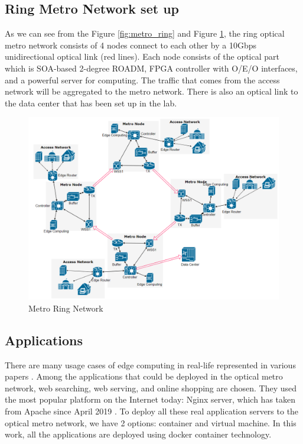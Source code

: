\documentclass[conference]{IEEEtran}
\begin{document}
\subsection{Ring Metro Network set up}

As we can see from the Figure \ref{fig:metro_ring} and Figure \ref{fig:full_metro_ring}, the ring optical metro network consists of 4 nodes connect to each other by a 10Gbps unidirectional optical link (red lines). Each node consists of the optical part which is SOA-based 2-degree ROADM, FPGA controller with O/E/O interfaces, and a powerful server for computing.  The traffic that comes from the access network will be aggregated to the metro network. There is also an optical link to the data center that has been set up in the lab.

\begin{figure}[]
    \centering
        \includegraphics[scale = 0.25]{imgs/metro_ring_with_DC.png}
        \caption{Metro Ring Network}
        \label{fig:full_metro_ring}
    \end{figure}

\subsection{Applications}

There are many usage cases of edge computing in real-life represented in various papers \cite{International2017, 7469991, Shi2016}. Among the applications that could be deployed in the optical metro network, web searching, web serving, and online shopping are chosen. They used the most popular platform on the Internet today: Nginx server, which has taken from Apache since April 2019 \cite{netcraft_news_2021}. To deploy all these real application servers to the optical metro network, we have 2 options: container and virtual machine. In this work, all the applications are deployed using docker container technology. 
\end{document}
